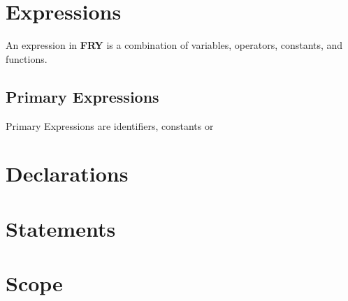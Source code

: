 \documentclass{article}
\begin{document}
\section{Expressions}
An expression in \textbf{FRY} is a combination of variables, operators, constants, and functions.
\subsection{Primary Expressions}
Primary Expressions are identifiers, constants or 

\section{Declarations}


\section{Statements}

\section{Scope}
\end{document}
